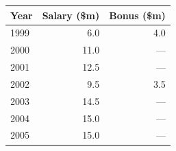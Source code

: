 \begin{tabular}{lrr}\toprule
Year & Salary (\$m) & Bonus (\$m)\\\midrule
1999 & 6.0 & 4.0\\
2000 & 11.0 & ---\\
2001 & 12.5 & ---\\
2002 & 9.5 & 3.5\\
2003 & 14.5 & ---\\
2004 & 15.0 & ---\\
2005 & 15.0 & ---\\
\bottomrule\end{tabular}
